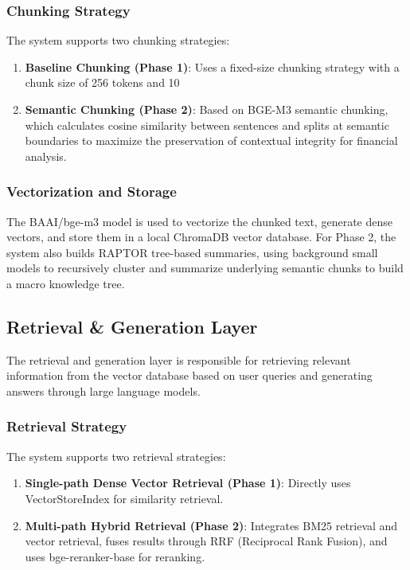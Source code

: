 \subsubsection{Chunking Strategy}
The system supports two chunking strategies:

\begin{enumerate}
    \item \textbf{Baseline Chunking (Phase 1)}: Uses a fixed-size chunking strategy with a chunk size of 256 tokens and 10%
    \item \textbf{Semantic Chunking (Phase 2)}: Based on BGE-M3 semantic chunking, which calculates cosine similarity between sentences and splits at semantic boundaries to maximize the preservation of contextual integrity for financial analysis.
\end{enumerate}

\subsubsection{Vectorization and Storage}
The BAAI/bge-m3 model is used to vectorize the chunked text, generate dense
vectors, and store them in a local ChromaDB vector database. For Phase 2, the
system also builds RAPTOR tree-based summaries, using background small models
to recursively cluster and summarize underlying semantic chunks to build a
macro knowledge tree.

\subsection{Retrieval \& Generation Layer}

The retrieval and generation layer is responsible for retrieving relevant
information from the vector database based on user queries and generating
answers through large language models.

\subsubsection{Retrieval Strategy}
The system supports two retrieval strategies:

\begin{enumerate}
    \item \textbf{Single-path Dense Vector Retrieval (Phase 1)}: Directly uses VectorStoreIndex for similarity retrieval.
    \item \textbf{Multi-path Hybrid Retrieval (Phase 2)}: Integrates BM25 retrieval and vector retrieval, fuses results through RRF (Reciprocal Rank Fusion), and uses bge-reranker-base for reranking.
\end{enumerate}

